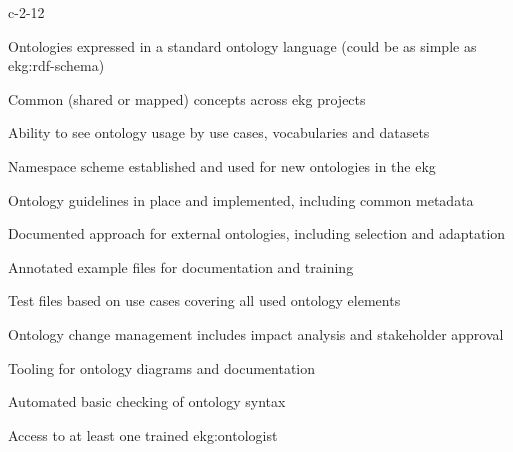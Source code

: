 \begin{level-assessment}{c-2-1}{2}

    \item Ontologies expressed in a standard ontology language (could be as simple as \gls{ekg:rdf-schema})
    \item Common (shared or mapped) concepts across \gls{ekg} projects
    \item Ability to see ontology usage by use cases, vocabularies and datasets
    \item Namespace scheme established and used for new ontologies in the \gls{ekg}
    \item Ontology guidelines in place and implemented, including common metadata
    \item Documented approach for external ontologies, including selection and adaptation
    \item Annotated example files for documentation and training
    \item Test files based on use cases covering all used ontology elements
    \item Ontology change management includes impact analysis and stakeholder approval
    \item Tooling for ontology diagrams and documentation
    \item Automated basic checking of ontology syntax
    \item Access to at least one trained \gls{ekg:ontologist}

\end{level-assessment}

